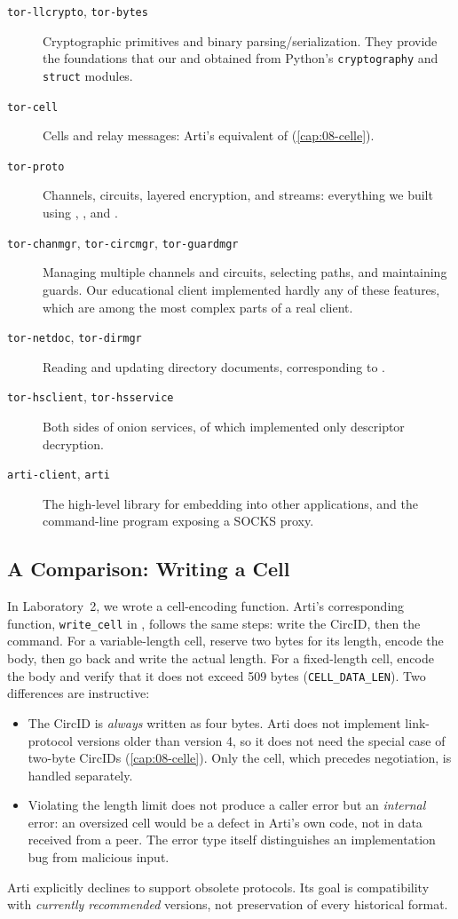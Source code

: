 \begin{description}
  \item[\texttt{tor-llcrypto}, \texttt{tor-bytes}] Cryptographic primitives and binary parsing/serialization. They provide the foundations that our  and  obtained from Python's \texttt{cryptography} and \texttt{struct} modules.
  \item[\texttt{tor-cell}] Cells and relay messages: Arti's equivalent of  (\cref{cap:08-celle}).
  \item[\texttt{tor-proto}] Channels, circuits, layered encryption, and streams: everything we built using , , and .
  \item[\texttt{tor-chanmgr}, \texttt{tor-circmgr}, \texttt{tor-guardmgr}] Managing multiple channels and circuits, selecting paths, and maintaining guards. Our educational client implemented hardly any of these features, which are among the most complex parts of a real client.
  \item[\texttt{tor-netdoc}, \texttt{tor-dirmgr}] Reading and updating directory documents, corresponding to .
  \item[\texttt{tor-hsclient}, \texttt{tor-hsservice}] Both sides of onion services, of which  implemented only descriptor decryption.
  \item[\texttt{arti-client}, \texttt{arti}] The high-level library for embedding into other applications, and the command-line program exposing a SOCKS proxy.
\end{description}

\subsection{A Comparison: Writing a Cell}

In Laboratory~2, we wrote a cell-encoding function. Arti's corresponding function, \texttt{write\_cell} in , follows the same steps: write the CircID, then the command. For a variable-length cell, reserve two bytes for its length, encode the body, then go back and write the actual length. For a fixed-length cell, encode the body and verify that it does not exceed 509 bytes (\texttt{CELL\_DATA\_LEN}). Two differences are instructive:
\begin{itemize}
  \item The CircID is \emph{always} written as four bytes. Arti does not implement link-protocol versions older than version 4, so it does not need the special case of two-byte CircIDs (\cref{cap:08-celle}). Only the  cell, which precedes negotiation, is handled separately.
  \item Violating the length limit does not produce a caller error but an \emph{internal} error: an oversized cell would be a defect in Arti's own code, not in data received from a peer. The error type itself distinguishes an implementation bug from malicious input.
\end{itemize}
Arti explicitly declines to support obsolete protocols. Its goal is compatibility with \emph{currently recommended} versions, not preservation of every historical format.

